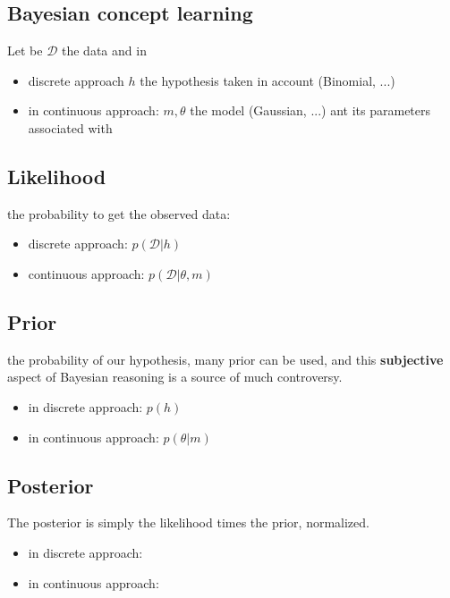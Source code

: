 \subsection{Bayesian concept learning}
Let be $\mathcal{D}$ the data and in 
\begin{itemize}
    \item discrete approach $h$ the hypothesis taken in account (Binomial, ...)
    \item in continuous approach: $m,\theta$ the model (Gaussian, ...) ant its parameters associated with
\end{itemize}

\subsection{Likelihood}
 the probability to get the observed data:  
\begin{itemize}
    \item discrete approach: $p\left(\mathcal{D}|h\right)$
    \item continuous approach: $p\left(\mathcal{D}|\theta,m\right)$
\end{itemize}

\subsection{Prior}
 the probability of our hypothesis, many prior can be used, and this 
\textbf{subjective} aspect of Bayesian reasoning is a source of much controversy.
\begin{itemize}
    \item in discrete approach: $p(h)$
    \item in continuous approach: $p(\theta|m)$
\end{itemize}


\subsection{Posterior}
The posterior is simply the likelihood times the prior, normalized.
\begin{center}
\begin{itemize}
    \item in discrete approach: 
    \item in continuous approach: 
\end{itemize}


\end{center}
